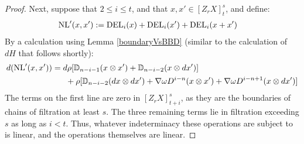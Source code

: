 \documentclass[11pt]{amsart} \renewcommand{\baselinestretch}{1.2}
\theoremstyle{plain}
\numberwithin{equation}{section} %
\theoremstyle{plain}
\numberwithin{equation}{chapter} %
\newcommand{\twist}{\omega}
\newcommand{\Nabla}{\nabla}
\newcommand{\EZdownup}[5]{[Z^{#2}_{#1}#3]^{#4}_{#5}}
\begin{document}
\begin{second quadrant homotopy sseq operations}
\begin{proof}
Next, suppose that $2\leq i\leq t$, and that $x,x'\in \EZdownup{r}{}{X}{s}{t}$, and define:
\begin{alignat*}{2}
\textup{NL}'(x,x'){}:={}&  \textup{DEL}_{i}(x)+\textup{DEL}_{i}(x')+\textup{DEL}_{i}(x+x') 
\end{alignat*}
By a calculation using Lemma \ref{boundaryVsBBD} (similar to the calculation of $dH$ that follows shortly):
\begin{alignat*}{2}
d(\textup{NL}'(x,x'))
&=
d\rho[\mathbb{D}_{n-i-1}(x\otimes x')+\mathbb{D}_{n-i-2}(x\otimes dx')]
\\
&\ \ \ \ \ +
\rho [\mathbb{D}_{n-i-2}(dx\otimes dx')+\nabla\twist D^{i-n}(x\otimes x')+\nabla\twist D^{i-n+1}(x\otimes dx')]%
\end{alignat*}
The terms on the first line are zero in $\EZdownup{r}{}{X}{s}{t+i}$, as they are the boundaries of chains of filtration at least $s$. The three remaining terms lie in filtration exceeding $s$ as long as $i<t$.
Thus, whatever indeterminacy these operations are subject to is linear, and the operations themselves are linear.



\end{proof}
\end{second quadrant homotopy sseq operations}
\end{document}
